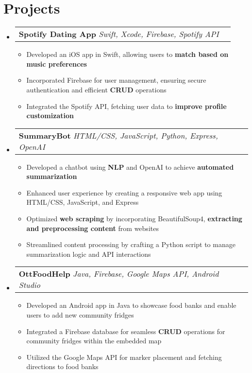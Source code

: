 \documentclass[letterpaper,11pt]{article}
\makeatletter
\newcommand{\resumeItem}[1]{
  \item\small{
    {#1 \vspace{-2pt}}
  }
}
\newcommand{\resumeSubheading}[3]{
    \item
    \begin{tabular*}{0.97\textwidth}[t]{l@{\extracolsep{\fill}}r}
      \textbf{#1} \textbar \textit{ #2} & \textbf{#3} \\
    \end{tabular*}\vspace{-4.5pt}
}
\newcommand{\resumeSubHeadingListStart}{\begin{itemize}[leftmargin=0.15in, label={}]}
\newcommand{\resumeSubHeadingListEnd}{\end{itemize}}
\newcommand{\resumeItemListStart}{\begin{itemize}}
\newcommand{\resumeItemListEnd}{\end{itemize}\vspace{-5pt}}
\makeatother
\begin{document}
\section{\textbf{\Large Projects}}
    \resumeSubHeadingListStart

        \resumeSubheading{Spotify Dating App}{Swift, Xcode, Firebase, Spotify API}{}
            \resumeItemListStart
                \resumeItem{Developed an iOS app in Swift, allowing users to \textbf{match based on music preferences}}
                \resumeItem{Incorporated Firebase for user management, ensuring secure authentication and efficient \textbf{CRUD} operations}
                \resumeItem{Integrated the Spotify API, fetching user data to \textbf{improve profile customization}}
            \resumeItemListEnd

        \resumeSubheading{SummaryBot}{HTML/CSS, JavaScript, Python, Express, OpenAI}{}
            \resumeItemListStart
                \resumeItem{Developed a chatbot using \textbf{NLP} and OpenAI to achieve \textbf{automated summarization}}
                \resumeItem{Enhanced user experience by creating a responsive web app using HTML/CSS, JavaScript, and Express}
                \resumeItem{Optimized \textbf{web scraping} by incorporating BeautifulSoup4, \textbf{extracting and preprocessing content} from websites}
                \resumeItem{Streamlined content processing by crafting a Python script to manage summarization logic and API interactions}
            \resumeItemListEnd

        \resumeSubheading{OttFoodHelp}{Java, Firebase, Google Maps API, Android Studio}{}
            \resumeItemListStart
            \resumeItem{Developed an Android app in Java to showcase food banks and enable users to add new community fridges}
            \resumeItem{Integrated a Firebase database for seamless \textbf{CRUD} operations for community fridges within the embedded map}
            \resumeItem{Utilized the Google Maps API for marker placement and fetching directions to food banks}
            \resumeItemListEnd
        \resumeSubHeadingListEnd

\end{document}
